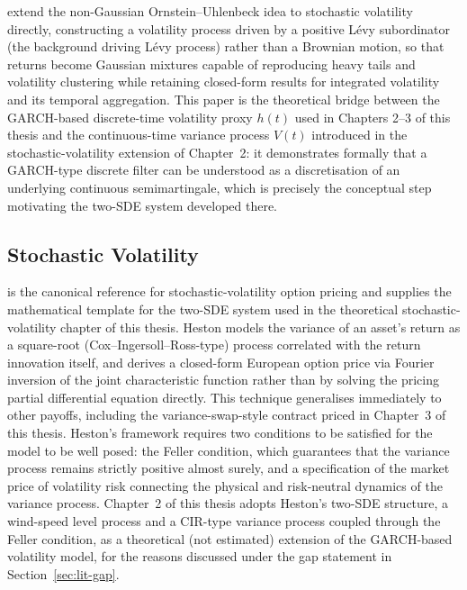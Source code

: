 ﻿\documentclass[11pt, a4paper, twoside]{article}
\begin{document}
\citet{BarndorffNielsenShephard2001} extend the non-Gaussian Ornstein--Uhlenbeck idea to stochastic volatility directly, constructing a volatility process driven by a positive Lévy subordinator (the background driving Lévy process) rather than a Brownian motion, so that returns become Gaussian mixtures capable of reproducing heavy tails and volatility clustering while retaining closed-form results for integrated volatility and its temporal aggregation. This paper is the theoretical bridge between the GARCH-based discrete-time volatility proxy $h(t)$ used in Chapters 2--3 of this thesis and the continuous-time variance process $V(t)$ introduced in the stochastic-volatility extension of Chapter~2: it demonstrates formally that a GARCH-type discrete filter can be understood as a discretisation of an underlying continuous semimartingale, which is precisely the conceptual step motivating the two-SDE system developed there.

\subsection{Stochastic Volatility}
\label{sec:lit-sv}

\citet{Heston1993} is the canonical reference for stochastic-volatility option pricing and supplies the mathematical template for the two-SDE system used in the theoretical stochastic-volatility chapter of this thesis. Heston models the variance of an asset's return as a square-root (Cox--Ingersoll--Ross-type) process correlated with the return innovation itself, and derives a closed-form European option price via Fourier inversion of the joint characteristic function rather than by solving the pricing partial differential equation directly. This technique generalises immediately to other payoffs, including the variance-swap-style contract priced in Chapter~3 of this thesis. Heston's framework requires two conditions to be satisfied for the model to be well posed: the Feller condition, which guarantees that the variance process remains strictly positive almost surely, and a specification of the market price of volatility risk connecting the physical and risk-neutral dynamics of the variance process. Chapter~2 of this thesis adopts Heston's two-SDE structure, a wind-speed level process and a CIR-type variance process coupled through the Feller condition, as a theoretical (not estimated) extension of the GARCH-based volatility model, for the reasons discussed under the gap statement in Section~\ref{sec:lit-gap}.
\end{document}
